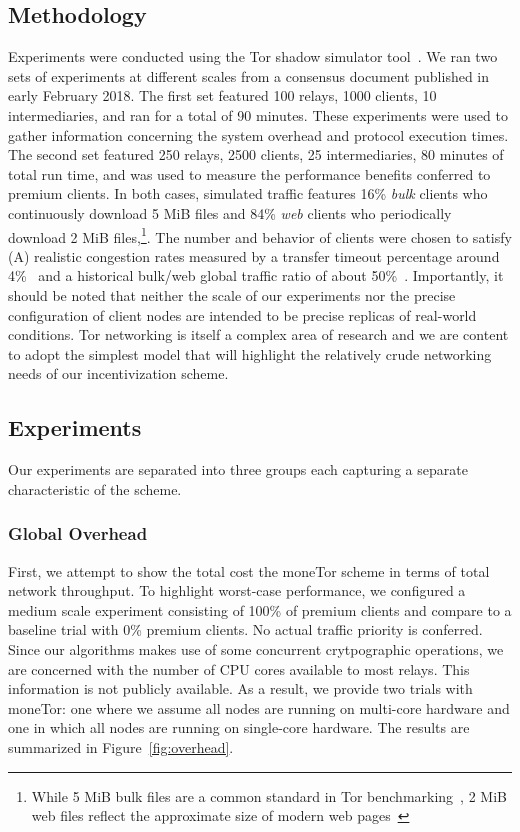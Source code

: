 \subsection{Methodology}
\label{subsec:methodology}

Experiments were conducted using the Tor shadow simulator
tool~\cite{jansen2011shadow}. We ran two sets of experiments at different
scales from a consensus document published in early February 2018. The first set featured 100 relays, 1000 clients, 10 intermediaries, and
ran for a total of 90 minutes. These experiments were used to gather information
concerning the system overhead and protocol execution times. The second set
featured 250 relays, 2500 clients, 25 intermediaries, 80 minutes of total run
time, and was used to measure the performance benefits conferred to premium
clients. In both cases, simulated traffic features 16\% \emph{bulk} clients who
continuously download 5 MiB files and 84\% \emph{web} clients who periodically
download 2 MiB files,\footnote{While 5 MiB bulk files are a common standard in
  Tor benchmarking~\cite{portal2018tormetrics}, 2 MiB web files reflect the
  approximate size of modern web pages~\cite{team2018httparchive}}. The number
and behavior of clients were chosen to satisfy (A) realistic congestion rates
measured by a transfer timeout percentage around 4\%~\cite{portal2018tormetrics}
and a historical bulk/web global traffic ratio of about
50\%~\cite{chaabane2010digging, mccoy2008shining}. Importantly, it should be
noted that neither the scale of our experiments nor the precise configuration of
client nodes are intended to be precise replicas of real-world conditions. Tor
networking is itself a complex area of research and we are content to adopt the
simplest model that will highlight the relatively crude networking needs of our
incentivization scheme.

\subsection{Experiments}
\label{subsec:experiments}
Our experiments are separated into three groups each capturing a separate
characteristic of the scheme.

\subsubsection{Global Overhead}

First, we attempt to show the total cost the moneTor scheme in terms of total
network throughput. To highlight worst-case performance, we configured a medium
scale experiment consisting of 100\% of premium clients and compare to a
baseline trial with 0\% premium clients. No actual traffic priority is
conferred. Since our algorithms makes use of some concurrent crytpographic
operations, we are concerned with the number of CPU cores available to most
relays. This information is not publicly available. As a result, we
provide two trials with moneTor: one where we assume all nodes are running on
multi-core hardware and one in which all nodes are running on single-core
hardware. The results are summarized in Figure~\ref{fig:overhead}.


